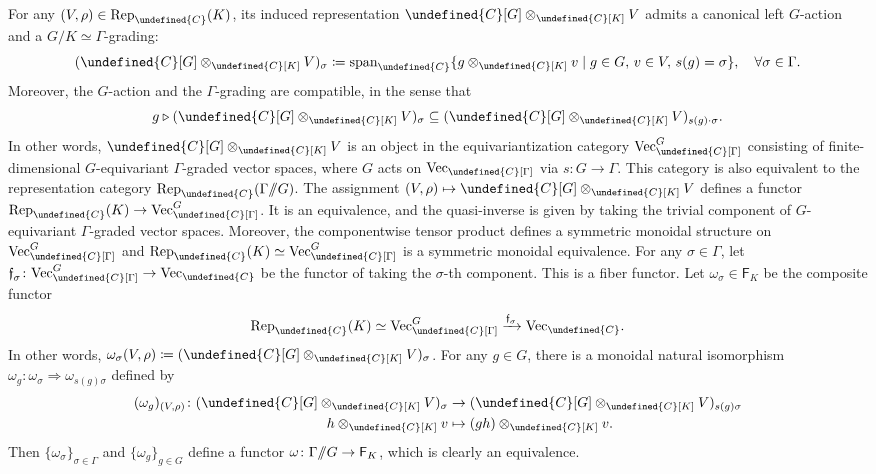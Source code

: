 \documentclass[10pt]{article}
\let\mathbb\undefined
\theoremstyle{definition}
\numberwithin{equation}{section}
\numberwithin{thm}{section}
\newcommand{\Cb}{\mathbb{C}}
\newcommand{\SF}{\mathsf{F}}
\newcommand{\forget}{\text{\usefont{U}{euf}{m}{n}f}}
\newcommand{\vect}{\mathrm{Vec}}
\newcommand{\rep}{\mathrm{Rep}}
\newcommand{\dquotient}{/\mkern-6mu/}
\begin{document}
For any $(V,\rho) \in \rep_\Cb(K)$, its induced representation $\Cb[G] \otimes_{\Cb[K]} V$ admits a canonical left $G$-action and a $G/K \simeq \Gamma$-grading:
\[
(\Cb[G] \otimes_{\Cb[K]} V)_\sigma \coloneqq \operatorname{span}_\Cb\{g \otimes_{\Cb[K]} v \mid g \in G , \, v \in V , \, s(g) = \sigma \} , \quad \forall \sigma \in \Gamma .
\]
Moreover, the $G$-action and the $\Gamma$-grading are compatible, in the sense that
\[
g \triangleright (\Cb[G] \otimes_{\Cb[K]} V)_\sigma \subseteq (\Cb[G] \otimes_{\Cb[K]} V)_{s(g) \cdot \sigma} .
\]
In other words, $\Cb[G] \otimes_{\Cb[K]} V$ is an object in the equivariantization category $\vect_\Cb[\Gamma]^G$ consisting of finite-dimensional $G$-equivariant $\Gamma$-graded vector spaces, where $G$ acts on $\vect_\Cb[\Gamma]$ via $s \colon G \to \Gamma$. This category is also equivalent to the representation category $\rep_\Cb(\Gamma \dquotient G)$. The assignment $(V,\rho) \mapsto \Cb[G] \otimes_{\Cb[K]} V$ defines a functor $\rep_\Cb(K) \to \vect_\Cb[\Gamma]^G$. It is an equivalence, and the quasi-inverse is given by taking the trivial component of $G$-equivariant $\Gamma$-graded vector spaces. Moreover, the componentwise tensor product defines a symmetric monoidal structure on $\vect_\Cb[\Gamma]^G$ and $\rep_\Cb(K) \simeq \vect_\Cb[\Gamma]^G$ is a symmetric monoidal equivalence. For any $\sigma \in \Gamma$, let $\forget_\sigma \colon \vect_\Cb[\Gamma]^G \to \vect_\Cb$ be the functor of taking the $\sigma$-th component. This is a fiber functor. Let $\omega_\sigma \in \SF_K$ be the composite functor
\[
\rep_\Cb(K) \simeq \vect_\Cb[\Gamma]^G \xrightarrow{\forget_\sigma} \vect_\Cb .
\]
In other words, $\omega_\sigma(V,\rho) \coloneqq (\Cb[G] \otimes_{\Cb[K]} V)_\sigma$. For any $g \in G$, there is a monoidal natural isomorphism $\omega_g \colon \omega_\sigma \Rightarrow \omega_{s(g) \sigma}$ defined by
\begin{align*}
(\omega_g)_{(V,\rho)} \colon (\Cb[G] \otimes_{\Cb[K]} V)_\sigma & \to (\Cb[G] \otimes_{\Cb[K]} V)_{s(g) \sigma} \\
h \otimes_{\Cb[K]} v & \mapsto (gh) \otimes_{\Cb[K]} v .
\end{align*}
Then $\{\omega_\sigma\}_{\sigma \in \Gamma}$ and $\{\omega_g\}_{g \in G}$ define a functor $\omega \colon \Gamma \dquotient G \to \SF_K$, which is clearly an equivalence.
\end{document}
